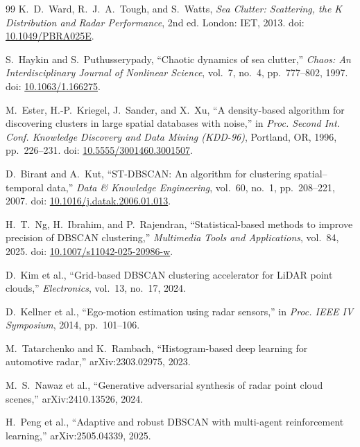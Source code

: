 \documentclass[conf]{new-aiaa}
\begin{document}
\begin{thebibliography}{99}
 K.~D.~Ward, R.~J.~A.~Tough, and S.~Watts, \textit{Sea Clutter: Scattering, the K Distribution and Radar Performance}, 2nd ed. London: IET, 2013. doi: \href{https://doi.org/10.1049/PBRA025E}{10.1049/PBRA025E}.

 S.~Haykin and S.~Puthusserypady, ``Chaotic dynamics of sea clutter,'' \textit{Chaos: An Interdisciplinary Journal of Nonlinear Science}, vol.~7, no.~4, pp.~777--802, 1997. doi: \href{https://doi.org/10.1063/1.166275}{10.1063/1.166275}.

 M.~Ester, H.-P.~Kriegel, J.~Sander, and X.~Xu, ``A density-based algorithm for discovering clusters in large spatial databases with noise,'' in \textit{Proc. Second Int. Conf. Knowledge Discovery and Data Mining (KDD-96)}, Portland, OR, 1996, pp.~226--231. doi: \href{https://doi.org/10.5555/3001460.3001507}{10.5555/3001460.3001507}.

 D.~Birant and A.~Kut, ``ST-DBSCAN: An algorithm for clustering spatial--temporal data,'' \textit{Data \& Knowledge Engineering}, vol.~60, no.~1, pp.~208--221, 2007. doi: \href{https://doi.org/10.1016/j.datak.2006.01.013}{10.1016/j.datak.2006.01.013}.

 H.~T.~Ng, H.~Ibrahim, and P.~Rajendran, ``Statistical-based methods to improve precision of DBSCAN clustering,'' \textit{Multimedia Tools and Applications}, vol.~84, 2025. doi: \href{https://doi.org/10.1007/s11042-025-20986-w}{10.1007/s11042-025-20986-w}.

 D.~Kim et al., ``Grid-based DBSCAN clustering accelerator for LiDAR point clouds,'' \textit{Electronics}, vol.~13, no.~17, 2024.

 D.~Kellner et al., ``Ego-motion estimation using radar sensors,'' in \textit{Proc. IEEE IV Symposium}, 2014, pp.~101--106.

 M.~Tatarchenko and K.~Rambach, ``Histogram-based deep learning for automotive radar,'' arXiv:2303.02975, 2023.

 M.~S.~Nawaz et al., ``Generative adversarial synthesis of radar point cloud scenes,'' arXiv:2410.13526, 2024.

 H.~Peng et al., ``Adaptive and robust DBSCAN with multi-agent reinforcement learning,'' arXiv:2505.04339, 2025.


\end{thebibliography}
\end{document}
